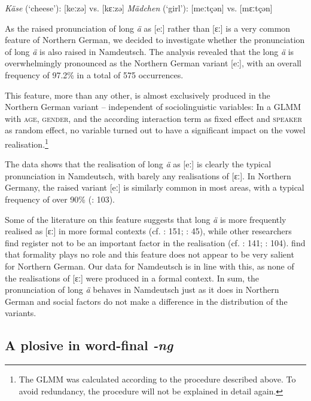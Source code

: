 \documentclass[output=paper]{langsci/langscibook}
\begin{document}
 

\ea 
\label{ex:stuhl:3}
{\textit{Käse}} (‘cheese’): {[keːzə]} vs. {[kɛːzə]} 
\ex
\label{ex:stuhl:4}
{\textit{Mädchen}} (‘girl’): {[meːtçən]} vs. {[}mɛːtçən{]}
 \z

As the raised pronunciation of long \textit{ä} as [eː] rather than [ɛː] is a very common feature of Northern German, we decided to investigate whether the pronunciation of long \textit{ä} is also raised in Namdeutsch. The analysis revealed that the long \textit{ä} is overwhelmingly pronounced as the Northern German variant [eː], with an overall frequency of 97.2\% in a total of 575 occurrences.

This feature, more than any other, is almost exclusively produced in the Northern German variant -- independent of sociolinguistic variables: In a GLMM with \textsc{age}, \textsc{gender}, and the according interaction term as fixed effect and \textsc{speaker} as random effect, no variable turned out to have a significant impact on the vowel realisation.\footnote{The GLMM was calculated according to the procedure described above. To avoid redundancy, the procedure will not be explained in detail again.} 

The data shows that the realisation of long \textit{ä} as [eː] is clearly the typical pronunciation in Namdeutsch, with barely any realisations of [ɛː]. In Northern Germany, the raised variant [eː] is similarly common in most areas, with a typical frequency of over 90\% (\citealt{elmentaler_norddeutscher_2015}: 103). 

Some of the literature on this feature suggests that long \textit{ä} is more frequently realised as [ɛː] in more formal contexts (cf. \citealt{stearns_contemporary_1979}: 151; \citealt{konig_atlas_2019a}: 45), while other researchers find register not to be an important factor in the realisation (cf. \citealt{herrmann-winter_studien_1979}: 141; \citealt{elmentaler_norddeutscher_2015}: 104). \citet[106]{elmentaler_norddeutscher_2015} find that formality plays no role and this feature does not appear to be very salient for Northern German. Our data for Namdeutsch is in line with this, as none of the realisations of [ɛː] were produced in a formal context. In sum, the pronunciation of long \textit{ä} behaves in Namdeutsch just as it does in Northern German and social factors do not make a difference in the distribution of the variants.

\subsection{A plosive in word-final \textit{-ng}}
\label{sec:stuhl:4.3}
\end{document}
